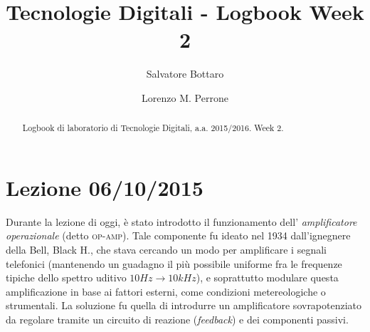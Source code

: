 \documentclass[journal, a4paper]{IEEEtran}
\begin{document}
	\title{Tecnologie Digitali - Logbook Week 2}
	\author[1]{Salvatore Bottaro}
		\author[2]{Lorenzo M. Perrone}
	\maketitle
	
\begin{abstract}
	Logbook di laboratorio di Tecnologie Digitali, a.a. 2015/2016. Week 2.
\end{abstract}

\section{Lezione 06/10/2015}
Durante la lezione di oggi, è stato introdotto il funzionamento dell' \textit{amplificatore operazionale} (detto \textsc{op-amp}). Tale componente fu ideato nel 1934 dall'ignegnere della Bell, Black H., che stava cercando un modo per amplificare i segnali telefonici (mantenendo un guadagno il più possibile uniforme fra le frequenze tipiche dello spettro uditivo $10\si{Hz}\rightarrow 10 \si{kHz} $),  e soprattutto modulare questa amplificazione in base ai fattori esterni, come condizioni metereologiche o strumentali. La soluzione fu quella di introdurre un amplificatore sovrapotenziato da regolare tramite un circuito di reazione (\textit{feedback}) e dei componenti passivi.

\begin{circuitikz}
\centering

\end{circuitikz}



\begin{figure}[htp]

\end{figure}







\subsection{}


\subsection{}
\end{document}
